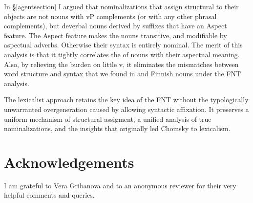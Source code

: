 \documentclass[output=paper,
modfonts
]{LSP/langsci}
\begin{document}
In \S\ref{agentsection} I argued that  nominalizations that assign structural
 to their objects are not nouns with vP complements (or with any other phrasal
complements), but deverbal nouns derived by  suffixes that have an Aspect feature.  The
Aspect feature makes the nouns transitive, and modifiable by aspectual adverbs.  Otherwise
their syntax is entirely nominal.  The merit of this analysis is that it tightly correlates the
 of  nouns with their aspectual meaning.  Also, by relieving the burden on
little v, it eliminates the mismatches between word structure and syntax that we found in 
and Finnish  nouns under the FNT analysis.

The lexicalist approach retains the key idea of the FNT without the typologically unwarranted
overgeneration caused by allowing syntactic affixation. It preserves a uniform mechanism of
structural  assigment, a unified analysis of true nominalizations, and the insights that
originally led Chomsky to lexicalism.


\section*{Acknowledgements}
I am grateful to Vera Gribanova and to an
    anonymous reviewer for their very helpful comments and queries.

{\sloppy
\printbibliography[heading=subbibliography,notkeyword=this]
}
\end{document}
